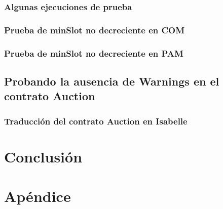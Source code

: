 \documentclass[12pt]{book}
\begin{document}
\subsection{Algunas ejecuciones de prueba}

\subsection{Prueba de minSlot no decreciente en COM}

\subsection{Prueba de minSlot no decreciente en PAM}

\section{Probando la ausencia de Warnings en el contrato Auction}

\subsection{Traducción del contrato Auction en Isabelle}


\chapter{Conclusión}


\chapter{Apéndice}




\end{document}
